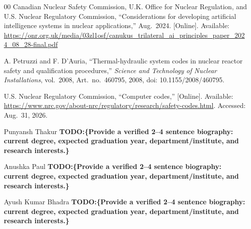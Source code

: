 \documentclass[journal]{IEEEtran}
\newcommand{\todo}[1]{\textcolor{green!50!black}{\textbf{TODO:\{#1\}}}}
\begin{document}
\begin{thebibliography}{00}
Canadian Nuclear Safety Commission, U.K. Office for Nuclear Regulation, and U.S. Nuclear Regulatory Commission,
``Considerations for developing artificial intelligence systems in nuclear applications,'' Aug.~2024. [Online]. Available: \url{https://onr.org.uk/media/03zl1osf/canukus_trilateral_ai_principles_paper_2024_08_28-final.pdf}

A. Petruzzi and F. D'Auria,
``Thermal-hydraulic system codes in nuclear reactor safety and qualification procedures,''
\textit{Science and Technology of Nuclear Installations}, vol.~2008, Art.~no.~460795, 2008, doi: 10.1155/2008/460795.

U.S. Nuclear Regulatory Commission,
``Computer codes,'' [Online]. Available: \url{https://www.nrc.gov/about-nrc/regulatory/research/safety-codes.html}. Accessed: Aug.~31, 2026.

\end{thebibliography}


\begin{IEEEbiographynophoto}{Punyansh Thakur}
\todo{Provide a verified 2--4 sentence biography: current degree, expected graduation year, department/institute, and research interests.}
\end{IEEEbiographynophoto}

\begin{IEEEbiographynophoto}{Anushka Paul}
\todo{Provide a verified 2--4 sentence biography: current degree, expected graduation year, department/institute, and research interests.}
\end{IEEEbiographynophoto}

\begin{IEEEbiographynophoto}{Ayush Kumar Bhadra}
\todo{Provide a verified 2--4 sentence biography: current degree, expected graduation year, department/institute, and research interests.}
\end{IEEEbiographynophoto}
\end{document}
